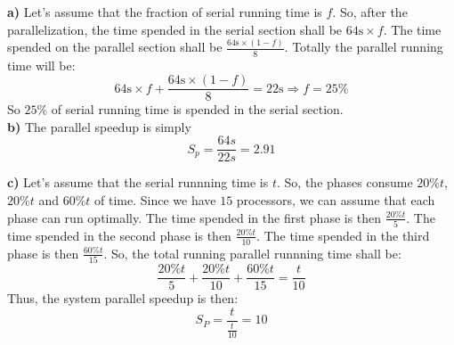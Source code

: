 \documentclass[a4paper]{article}
\begin{document}
\section{} %
\textbf{a)}
Let's assume that the fraction of serial running time is $f$.
So, after the parallelization, the time spended in the serial section shall be $64\text{s} \times f$.
The time spended on the parallel section shall be $\frac{64\text{s} \times \left(1-f\right)}{8}$.
Totally the parallel running time will be:
\[
64\text{s} \times f + \frac{64\text{s} \times \left(1-f\right)}{8} = 22\text{s} \Rightarrow f=25\%
\]
So $25\%$ of serial running time is spended in the serial section.
\\

\textbf{b)}
The parallel speedup is simply
\[
S_p = \frac{64s}{22s} = 2.91
\]

\textbf{c)}
Let's assume that the serial runnning time is $t$.
So, the phases consume $20\%t$, $20\%t$ and $60\%t$ of time.
Since we have $15$ processors, we can assume that each phase can run optimally.
The time spended in the first phase is then $\frac{20\%t}{5}$. 
The time spended in the second phase is then $\frac{20\%t}{10}$. 
The time spended in the third phase is then $\frac{60\%t}{15}$.
So, the total running parallel runnning time shall be:
\[
\frac{20\%t}{5} + \frac{20\%t}{10} + \frac{60\%t}{15} = \frac{t}{10}
\]
Thus, the system parallel speedup is then:
\[
S_P=\frac{t}{\frac{t}{10}} = 10
\]
\end{document}
